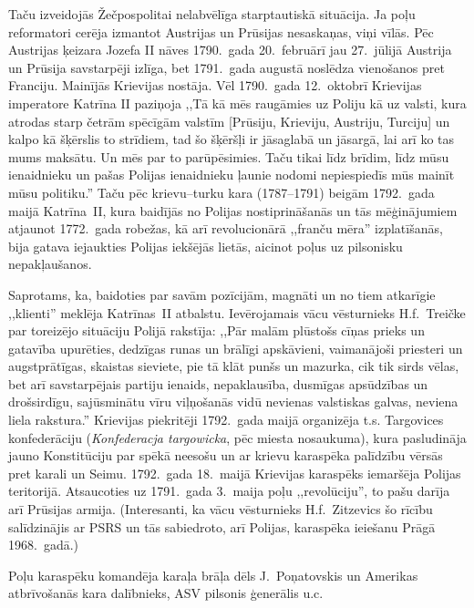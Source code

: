 \documentclass[twoside,a5paper,12pt,fleqn,openany]{extbook}
\newcommand{\pltxti}[1]{\textit{\textpolish{#1}}}
\begin{document}
Taču izveidojās Žečpospolitai nelabvēlīga starptautiskā situācija. Ja poļu reformatori cerēja izmantot Austrijas un Prūsijas nesaskaņas, viņi vīlās. Pēc Austrijas ķeizara Jozefa II nāves 1790.~gada 20.~februārī jau 27.~jūlijā Austrija un Prūsija savstarpēji izlīga, bet 1791.~gada augustā noslēdza vienošanos pret Franciju. Mainījās Krievijas nostāja. Vēl 1790.~gada 12.~oktobrī Krievijas imperatore Katrīna II paziņoja ,,Tā kā mēs raugāmies uz Poliju kā uz valsti, kura atrodas starp četrām spēcīgām valstīm [Prūsiju, Krieviju, Austriju, Turciju] un kalpo kā šķērslis to strīdiem, tad šo šķēršļi ir jāsaglabā un jāsargā, lai arī ko tas mums maksātu. Un mēs par to parūpēsimies. Taču tikai līdz brīdim, līdz mūsu ienaidnieku un pašas Polijas ienaidnieku ļaunie nodomi nepiespiedīs mūs mainīt mūsu politiku.'' Taču pēc krievu--turku kara (1787--1791) beigām 1792.~gada maijā Katrīna~II, kura baidījās no Polijas nostiprināšanās un tās mēģinājumiem atjaunot 1772.~gada robežas, kā arī revolucionārā ,,franču mēra'' izplatīšanās, bija gatava iejaukties Polijas iekšējās lietās, aicinot poļus uz pilsonisku nepakļaušanos.

Saprotams, ka, baidoties par savām pozīcijām, magnāti un no tiem atkarīgie ,,klienti'' meklēja Katrīnas~II atbalstu. Ievērojamais vācu vēsturnieks H.f.~Treičke par toreizējo situāciju Polijā rakstīja: ,,Pār malām plūstošs cīņas prieks un gatavība upurēties, dedzīgas runas un brālīgi apskāvieni, vaimanājoši priesteri un augstprātīgas, skaistas sieviete, pie tā klāt punšs un mazurka, cik tik sirds vēlas, bet arī savstarpējais partiju ienaids, nepaklausība, dusmīgas apsūdzības un drošsirdīgu, sajūsminātu vīru viļņošanās vidū nevienas valstiskas galvas, neviena liela rakstura.'' Krievijas piekritēji 1792.~gada maijā organizēja t.s. Targovices konfederāciju (\pltxti{Konfederacja targowicka}, pēc miesta nosaukuma), kura pasludināja jauno Konstitūciju par spēkā neesošu un ar krievu karaspēka palīdzību vērsās pret karali un Seimu. 1792.~gada 18.~maijā Krievijas karaspēks iemaršēja Polijas teritorijā. Atsaucoties uz 1791.~gada 3.~maija poļu ,,revolūciju'', to pašu darīja arī Prūsijas armija. (Interesanti, ka vācu vēsturnieks H.f.~Zitzevics šo rīcību salīdzinājis ar PSRS un tās sabiedroto, arī Polijas, karaspēka ieiešanu Prāgā 1968.~gadā.)

Poļu karaspēku komandēja karaļa brāļa dēls J.~Poņatovskis un Amerikas atbrīvošanās kara dalībnieks, ASV pilsonis ģenerālis  u.c.
\end{document}
